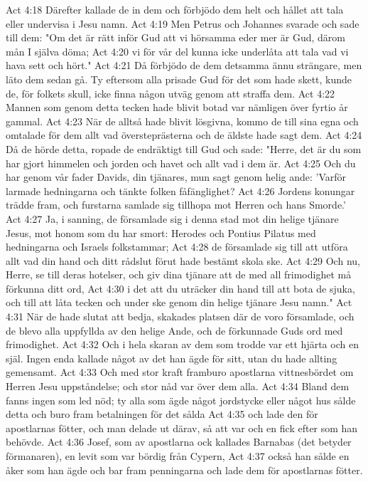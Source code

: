 Act 4:18  Därefter kallade de in dem och förbjödo dem helt och hållet att tala eller undervisa i Jesu namn.
Act 4:19  Men Petrus och Johannes svarade och sade till dem: "Om det är rätt inför Gud att vi hörsamma eder mer är Gud, därom mån I själva döma;
Act 4:20  vi för vår del kunna icke underlåta att tala vad vi hava sett och hört."
Act 4:21  Då förbjödo de dem detsamma ännu strängare, men läto dem sedan gå. Ty eftersom alla prisade Gud för det som hade skett, kunde de, för folkets skull, icke finna någon utväg genom att straffa dem.
Act 4:22  Mannen som genom detta tecken hade blivit botad var nämligen över fyrtio år gammal.
Act 4:23  När de alltså hade blivit lösgivna, kommo de till sina egna och omtalade för dem allt vad översteprästerna och de äldste hade sagt dem.
Act 4:24  Då de hörde detta, ropade de endräktigt till Gud och sade: "Herre, det är du som har gjort himmelen och jorden och havet och allt vad i dem är.
Act 4:25  Och du har genom vår fader Davids, din tjänares, mun sagt genom helig ande: 'Varför larmade hedningarna och tänkte folken fåfänglighet?
Act 4:26  Jordens konungar trädde fram, och furstarna samlade sig tillhopa mot Herren och hans Smorde.'
Act 4:27  Ja, i sanning, de församlade sig i denna stad mot din helige tjänare Jesus, mot honom som du har smort: Herodes och Pontius Pilatus med hedningarna och Israels folkstammar;
Act 4:28  de församlade sig till att utföra allt vad din hand och ditt rådslut förut hade bestämt skola ske.
Act 4:29  Och nu, Herre, se till deras hotelser, och giv dina tjänare att de med all frimodighet må förkunna ditt ord,
Act 4:30  i det att du uträcker din hand till att bota de sjuka, och till att låta tecken och under ske genom din helige tjänare Jesu namn."
Act 4:31  När de hade slutat att bedja, skakades platsen där de voro församlade, och de blevo alla uppfyllda av den helige Ande, och de förkunnade Guds ord med frimodighet.
Act 4:32  Och i hela skaran av dem som trodde var ett hjärta och en själ. Ingen enda kallade något av det han ägde för sitt, utan du hade allting gemensamt.
Act 4:33  Och med stor kraft framburo apostlarna vittnesbördet om Herren Jesu uppståndelse; och stor nåd var över dem alla.
Act 4:34  Bland dem fanns ingen som led nöd; ty alla som ägde något jordstycke eller något hus sålde detta och buro fram betalningen för det sålda
Act 4:35  och lade den för apostlarnas fötter, och man delade ut därav, så att var och en fick efter som han behövde.
Act 4:36  Josef, som av apostlarna ock kallades Barnabas (det betyder förmanaren), en levit som var bördig från Cypern,
Act 4:37  också han sålde en åker som han ägde och bar fram penningarna och lade dem för apostlarnas fötter.
